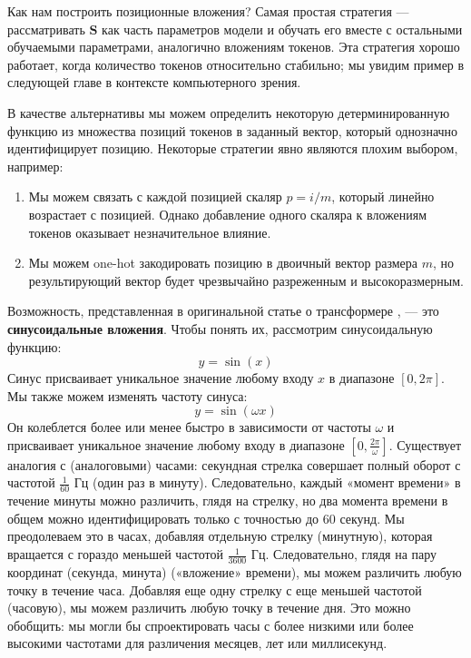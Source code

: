 Как нам построить позиционные вложения? Самая простая стратегия — рассматривать $\mathbf{S}$ как часть параметров модели и обучать его вместе с остальными обучаемыми параметрами, аналогично вложениям токенов. Эта стратегия хорошо работает, когда количество токенов относительно стабильно; мы увидим пример в следующей главе в контексте компьютерного зрения.

В качестве альтернативы мы можем определить некоторую детерминированную функцию из множества позиций токенов в заданный вектор, который однозначно идентифицирует позицию. Некоторые стратегии явно являются плохим выбором, например:
%
\begin{enumerate}
\item Мы можем связать с каждой позицией скаляр $p=i/m$, который линейно возрастает с позицией. Однако добавление одного скаляра к вложениям токенов оказывает незначительное влияние.
\item Мы можем one-hot закодировать позицию в двоичный вектор размера $m$, но результирующий вектор будет чрезвычайно разреженным и высокоразмерным.
\end{enumerate}
%
Возможность, представленная в оригинальной статье о трансформере \cite{vaswani2017attention}, — это \textbf{синусоидальные вложения}. Чтобы понять их, рассмотрим синусоидальную функцию:
%
$$
y=\sin(x)
$$
%
Синус присваивает уникальное значение любому входу $x$ в диапазоне $[0, 2\pi]$. Мы также можем изменять частоту синуса:
%
$$
y=\sin(\omega x)
$$
%
Он колеблется более или менее быстро в зависимости от частоты $\omega$ и присваивает уникальное значение любому входу в диапазоне $[0, \frac{2\pi}{\omega}]$. Существует аналогия с (аналоговыми) часами: секундная стрелка совершает полный оборот с частотой $\frac{1}{60}$ Гц (один раз в минуту). Следовательно, каждый «момент времени» в течение минуты можно различить, глядя на стрелку, но два момента времени в общем можно идентифицировать только с точностью до 60 секунд. Мы преодолеваем это в часах, добавляя отдельную стрелку (минутную), которая вращается с гораздо меньшей частотой $\frac{1}{3600}$ Гц. Следовательно, глядя на пару координат (секунда, минута) («вложение» времени), мы можем различить любую точку в течение часа. Добавляя еще одну стрелку с еще меньшей частотой (часовую), мы можем различить любую точку в течение дня. Это можно обобщить: мы могли бы спроектировать часы с более низкими или более высокими частотами для различения месяцев, лет или миллисекунд.


